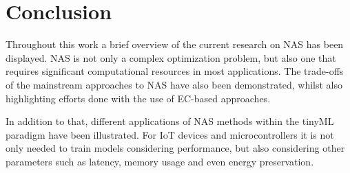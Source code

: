 \documentclass[10pt,        %
               a4paper,     %
               journal,     %
               ]{IEEEtran}
\begin{document}
\section{Conclusion}
Throughout this work a brief overview of the current research on NAS has been displayed. NAS is not only
a complex optimization problem, but also one that requires significant computational resources in most applications. The
trade-offs of the mainstream approaches to NAS have also been demonstrated, whilst also highlighting efforts done with the
use of EC-based approaches.

In addition to that, different applications of NAS methods within the tinyML paradigm have been illustrated.
For IoT devices and microcontrollers it is not only needed to train models considering performance,
but also considering other parameters such as latency, memory usage and even energy preservation.

\newpage



%
\end{document}
